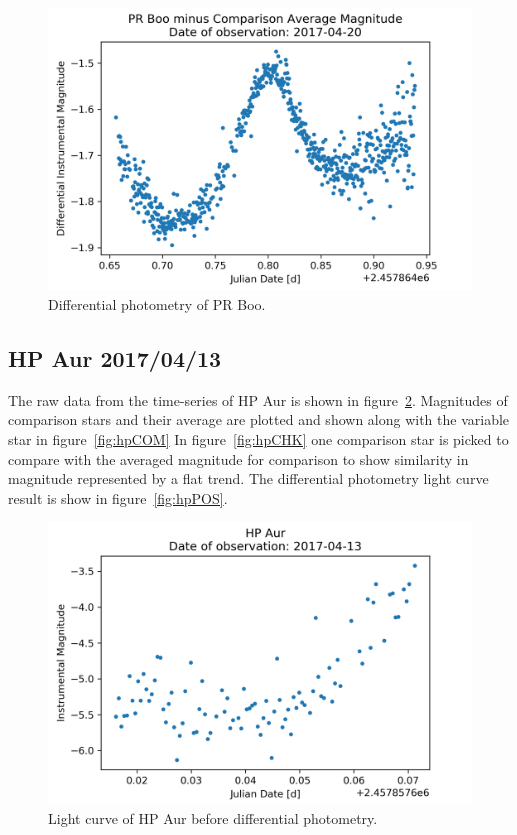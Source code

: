 \begin{figure}[h]
    \centering
    \includegraphics{figures/prboo170420POS.png}
    \caption{Differential photometry of PR Boo.}
\label{fig:prPOS2}
\end{figure}

\subsection{HP Aur 2017/04/13}
The raw data from the time-series of HP Aur is shown in figure~\ref{fig:hpRAW}.
Magnitudes of comparison stars and their average are plotted and shown along with the variable star in figure~\ref{fig:hpCOM}
In figure~\ref{fig:hpCHK} one comparison star is picked to compare with the averaged magnitude for comparison to show similarity
in magnitude represented by a flat trend.
The differential photometry light curve result is show in figure~\ref{fig:hpPOS}.

\begin{figure}[h]
    \centering
    \includegraphics{figures/hpaur170413RAW.png}
    \caption{Light curve of HP Aur before differential photometry.}
\label{fig:hpRAW}
\end{figure}

